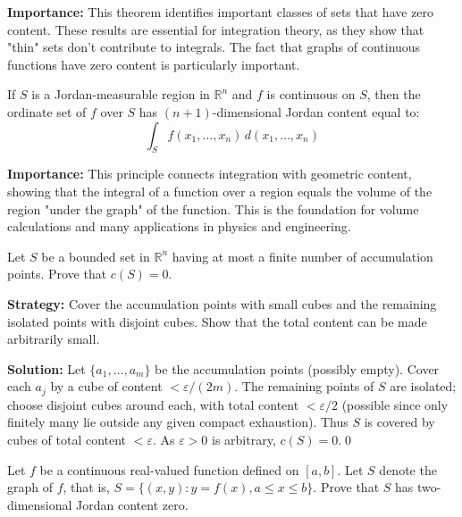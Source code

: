 \noindent\textbf{Importance:} This theorem identifies important classes of sets that have zero content. These results are essential for integration theory, as they show that "thin" sets don't contribute to integrals. The fact that graphs of continuous functions have zero content is particularly important.



\begin{theorem}
If $S$ is a Jordan-measurable region in $\mathbb{R}^n$ and $f$ is continuous on $S$, then the ordinate set of $f$ over $S$ has $(n+1)$-dimensional Jordan content equal to:
\[\int_S f(x_1, \ldots, x_n) \, d(x_1, \ldots, x_n)\]
\end{theorem}

\noindent\textbf{Importance:} This principle connects integration with geometric content, showing that the integral of a function over a region equals the volume of the region "under the graph" of the function. This is the foundation for volume calculations and many applications in physics and engineering.





\begin{problembox}
\begin{problemstatement}
Let \( S \) be a bounded set in \( \mathbb{R}^n \) having at most a finite number of accumulation points. Prove that \( c(S) = 0 \).
\end{problemstatement}
\end{problembox}

\noindent\textbf{Strategy:} Cover the accumulation points with small cubes and the remaining isolated points with disjoint cubes. Show that the total content can be made arbitrarily small.

\bigskip\noindent\textbf{Solution:}
Let $\{a_1,\dots,a_m\}$ be the accumulation points (possibly empty). Cover each $a_j$ by a cube of content $<\varepsilon/(2m)$. The remaining points of $S$ are isolated; choose disjoint cubes around each, with total content $<\varepsilon/2$ (possible since only finitely many lie outside any given compact exhaustion). Thus $S$ is covered by cubes of total content $<\varepsilon$. As $\varepsilon>0$ is arbitrary, $c(S)=0$.\qed


\begin{problembox}
\begin{problemstatement}
Let \( f \) be a continuous real-valued function defined on \([a, b]\). Let \( S \) denote the graph of \( f \), that is, \( S = \{(x, y) : y = f(x), a \leq x \leq b\} \). Prove that \( S \) has two-dimensional Jordan content zero.
\end{problemstatement}
\end{problembox}

